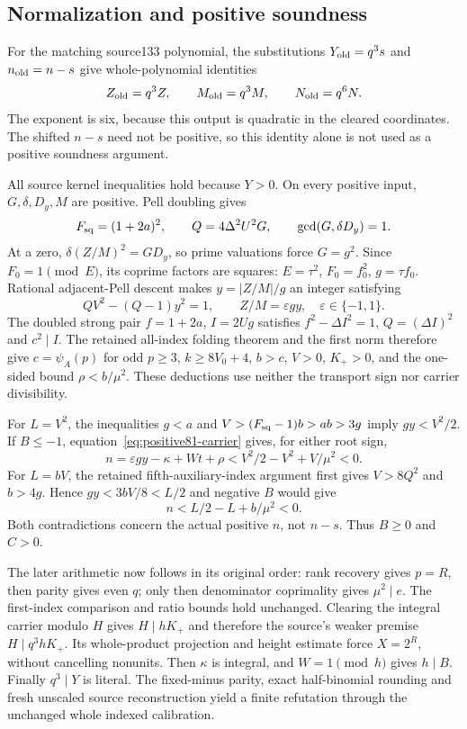 \documentclass[11pt]{article}
\begin{document}
\subsection{Normalization and positive soundness}
For the matching source133 polynomial, the substitutions
$Y_{\rm old}=q^3s$ and $n_{\rm old}=n-s$ give whole-polynomial identities
\[
 Z_{\rm old}=q^3Z,\qquad M_{\rm old}=q^3M,
 \qquad N_{\rm old}=q^6N.
\]
The exponent is six, because this output is quadratic in the cleared
coordinates. The shifted $n-s$ need not be positive, so this identity alone
is not used as a positive soundness argument.

All source kernel inequalities hold because $Y>0$. On every positive
input, $G,\delta,D_y,M$ are positive. Pell doubling gives
\[
 F_{\rm sq}=(1+2a)^2,\qquad Q=4\Delta^2U^2G,
 \qquad \gcd(G,\delta D_y)=1.
\]
At a zero, $\delta(Z/M)^2=GD_y$, so prime valuations force $G=g^2$.
Since $F_0=1\pmod E$, its coprime factors are squares:
$E=\tau^2$, $F_0=f_0^2$, $g=\tau f_0$.
Rational adjacent-Pell descent makes
$y=|Z/M|/g$ an integer satisfying
\[
 QV^2-(Q-1)y^2=1,\qquad Z/M=\varepsilon gy,
 \quad \varepsilon\in\{-1,1\}.
\]
The doubled strong pair $f=1+2a$, $I=2Ug$ satisfies
$f^2-\Delta I^2=1$, $Q=(\Delta I)^2$ and $c^2\mid I$.
The retained all-index folding theorem and the first norm therefore give
$c=\psi_A(p)$ for odd $p\ge3$, $k\ge8V_0+4$, $b>c$,
$V>0$, $K_+>0$, and the one-sided bound $\rho<b/\mu^2$.
These deductions use neither the transport sign nor carrier divisibility.

For $L=V^2$, the inequalities $g<a$ and
$V>(F_{\rm sq}-1)b>ab>3g$ imply $gy<V^2/2$.
If $B\le-1$, equation~\eqref{eq:positive81-carrier} gives, for either
root sign,
\[
 n=\varepsilon gy-\kappa+Wt+\rho
 <V^2/2-V^2+V/\mu^2<0.
\]
For $L=bV$, the retained fifth-auxiliary-index argument first gives
$V>8Q^2$ and $b>4g$. Hence $gy<3bV/8<L/2$ and negative $B$ would give
\[
 n<L/2-L+b/\mu^2<0.
\]
Both contradictions concern the actual positive $n$, not $n-s$.
Thus $B\ge0$ and $C>0$.

The later arithmetic now follows in its original order: rank recovery
gives $p=R$, then parity gives even $q$; only then denominator coprimality
gives $\mu^2\mid e$. The first-index comparison and ratio bounds hold
unchanged. Clearing the integral carrier modulo $H$ gives
$H\mid hK_+$ and therefore the source's weaker premise
$H\mid q^3hK_+$. Its whole-product projection and height estimate force
$X=2^R$, without cancelling nonunits. Then $\kappa$ is integral, and
$W=1\pmod h$ gives $h\mid B$. Finally $q^3\mid Y$ is literal.
The fixed-minus parity, exact half-binomial rounding and fresh unscaled
source reconstruction yield a finite refutation through the unchanged
whole indexed calibration.
\end{document}
